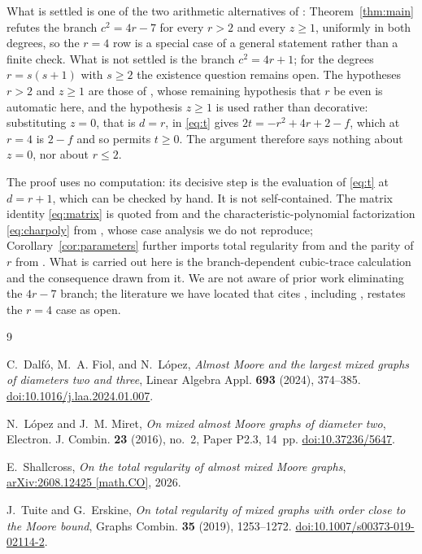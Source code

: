 \documentclass[11pt]{amsart}
\begin{document}
What is settled is one of the two arithmetic alternatives of
\cite[Theorem~2]{LM}: Theorem~\ref{thm:main} refutes the branch
$c^2=4r-7$ for every $r>2$ and every $z\geq 1$, uniformly in both
degrees, so the $r=4$ row is a special case of a general statement
rather than a finite check. What is not settled is the branch
$c^2=4r+1$; for the degrees $r=s(s+1)$ with $s\geq 2$ the existence
question remains open. The hypotheses $r>2$ and $z\geq 1$ are those
of \cite[Theorem~2]{LM}, whose remaining hypothesis that $r$ be even
is automatic here, and the hypothesis $z\geq 1$ is used rather than
decorative: substituting $z=0$, that is $d=r$, in \eqref{eq:t} gives
$2t=-r^2+4r+2-f$, which at $r=4$ is $2-f$ and so permits $t\geq 0$.
The argument therefore says nothing about $z=0$, nor about $r\leq 2$.

The proof uses no computation: its decisive step is the evaluation
of \eqref{eq:t} at $d=r+1$, which can be checked by hand. It is not
self-contained. The matrix identity \eqref{eq:matrix} is quoted from
\cite[Eq.~(1)]{LM} and the characteristic-polynomial factorization
\eqref{eq:charpoly} from \cite[proof of Theorem~2]{LM}, whose case
analysis we do not reproduce; Corollary~\ref{cor:parameters} further
imports total regularity from \cite[Theorem~2.8]{TE} and the parity
of $r$ from \cite[Proposition~1]{LM}. What is carried out here is the
branch-dependent cubic-trace calculation and the consequence drawn
from it. We are not aware of prior work eliminating the
$4r-7$ branch; the literature we have located that cites \cite{LM},
including \cite{DFL}, restates the $r=4$ case as open.

\begin{thebibliography}{9}

C.~Dalf\'o, M.~A. Fiol, and N.~L\'opez,
\emph{Almost Moore and the largest mixed graphs of diameters two and
three},
Linear Algebra Appl. \textbf{693} (2024), 374--385.
\href{https://doi.org/10.1016/j.laa.2024.01.007}
{doi:10.1016/j.laa.2024.01.007}.

N.~L\'opez and J.~M. Miret,
\emph{On mixed almost Moore graphs of diameter two},
Electron. J. Combin. \textbf{23} (2016), no.~2,
Paper P2.3, 14~pp.
\href{https://doi.org/10.37236/5647}
{doi:10.37236/5647}.

E.~Shallcross,
\emph{On the total regularity of almost mixed Moore graphs},
\href{https://arxiv.org/abs/2608.12425}
{arXiv:2608.12425 [math.CO]}, 2026.

J.~Tuite and G.~Erskine,
\emph{On total regularity of mixed graphs with order close to the
Moore bound},
Graphs Combin. \textbf{35} (2019), 1253--1272.
\href{https://doi.org/10.1007/s00373-019-02114-2}
{doi:10.1007/s00373-019-02114-2}.

\end{thebibliography}
\end{document}
